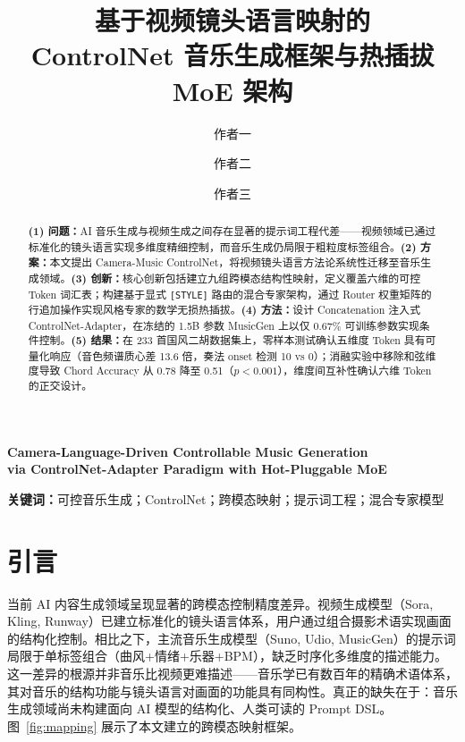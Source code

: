 \documentclass[11pt,twocolumn]{article}
\title{\vspace{-1.2cm}\bfseries 基于视频镜头语言映射的\\ControlNet 音乐生成框架与热插拔 MoE 架构}
\author[1]{作者一}
\author[2]{作者二}
\author[1]{作者三}
\affil[1]{XX大学 · 计算机学院}
\affil[2]{XX大学 · 人工智能研究院}
\date{}
\begin{document}
\maketitle

\begin{center}
\footnotesize\textbf{Camera-Language-Driven Controllable Music Generation\\via ControlNet-Adapter Paradigm with Hot-Pluggable MoE}
\end{center}

\begin{abstract}
\noindent
\textbf{(1) 问题：}AI 音乐生成与视频生成之间存在显著的提示词工程代差——视频领域已通过标准化的镜头语言实现多维度精细控制，而音乐生成仍局限于粗粒度标签组合。\textbf{(2) 方案：}本文提出 Camera-Music ControlNet，将视频镜头语言方法论系统性迁移至音乐生成领域。\textbf{(3) 创新：}核心创新包括建立九组跨模态结构性映射，定义覆盖六维的可控 Token 词汇表；构建基于显式 \texttt{[STYLE]} 路由的混合专家架构，通过 Router 权重矩阵的行追加操作实现风格专家的数学无损热插拔。\textbf{(4) 方法：}设计 Concatenation 注入式 ControlNet-Adapter，在冻结的 1.5B 参数 MusicGen 上以仅 0.67\% 可训练参数实现条件控制。\textbf{(5) 结果：}在 233 首国风二胡数据集上，零样本测试确认五维度 Token 具有可量化响应（音色频谱质心差 13.6 倍，奏法 onset 检测 10 vs 0）；消融实验中移除和弦维度导致 Chord Accuracy 从 0.78 降至 0.51（$p<0.001$），维度间互补性确认六维 Token 的正交设计。
\end{abstract}

\vspace{2pt}
\noindent\footnotesize\textbf{关键词：}可控音乐生成；ControlNet；跨模态映射；提示词工程；混合专家模型

\section{引言}

当前 AI 内容生成领域呈现显著的跨模态控制精度差异。视频生成模型（Sora, Kling, Runway）已建立标准化的镜头语言体系，用户通过组合摄影术语实现画面的结构化控制。相比之下，主流音乐生成模型（Suno, Udio, MusicGen）的提示词局限于单标签组合（曲风+情绪+乐器+BPM），缺乏时序化多维度的描述能力。这一差异的根源并非音乐比视频更难描述——音乐学已有数百年的精确术语体系，其对音乐的结构功能与镜头语言对画面的功能具有同构性。真正的缺失在于：音乐生成领域尚未构建面向 AI 模型的结构化、人类可读的 Prompt DSL。图~\ref{fig:mapping} 展示了本文建立的跨模态映射框架。
\end{document}
